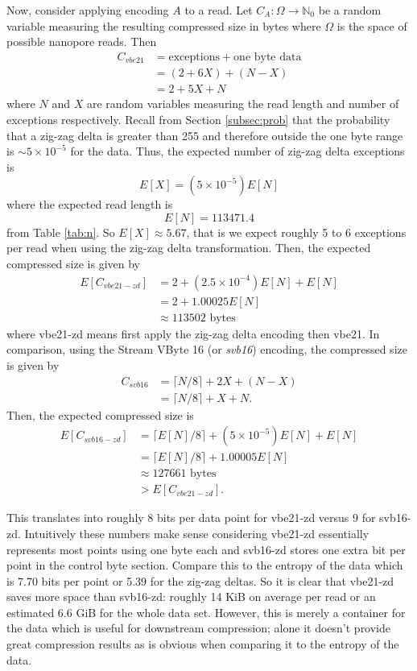 Now, consider applying encoding $A$ to a read. Let $C_A:\Omega\to\mathbb{N}_0$
be a random variable measuring the resulting compressed size in bytes where
$\Omega$ is the space of possible nanopore reads. Then
\begin{align*}
	C_{vbe21} &= \text{exceptions} + \text{one byte data}\\
	&= (2 + 6X) + (N - X)\\
	&= 2 + 5X + N
\end{align*}
where $N$ and $X$ are random variables measuring the read length and number of
exceptions respectively. Recall from Section \ref{subsec:prob} that the
probability that a zig-zag delta is greater than 255 and therefore outside the one
byte range is $\sim 5\times 10^{-5}$ for the data. Thus, the expected number of
zig-zag delta exceptions is
\[ E[X] = (5 \times 10^{-5})E[N] \]
where the expected read length is
\[ E[N] = 113471.4 \]
from Table \ref{tab:n}. So $E[X] \approx 5.67$, that is we expect roughly 5 to 6
exceptions per read when using the zig-zag delta transformation.
Then, the expected compressed size is given by
\begin{align*}
	E[C_{vbe21-zd}] &= 2 + (2.5\times 10^{-4})E[N]+ E[N]\\
	&= 2 + 1.00025E[N]\\
	&\approx 113502 \text{ bytes}
\end{align*}
where vbe21-zd means first apply the zig-zag delta encoding then vbe21. In
comparison, using the Stream VByte 16 (or \textit{svb16}) encoding, the
compressed size is given by
\begin{align*}
	C_{svb16} &= \lceil N/8 \rceil + 2X + (N - X)\\
	&= \lceil N/8 \rceil + X + N.
\end{align*}
Then, the expected compressed size is
\begin{align*}
	E[C_{svb16-zd}] &= \lceil E[N]/8 \rceil + (5 \times 10^{-5})E[N] + E[N]\\
	&= \lceil E[N]/8 \rceil + 1.00005E[N]\\
	&\approx 127661 \text{ bytes}\\
	&> E[C_{vbe21-zd}].
\end{align*}

This translates into roughly 8 bits per data point for vbe21-zd versus
9 for svb16-zd.
Intuitively these numbers make sense considering vbe21-zd essentially represents
most points using one byte each and svb16-zd stores one extra bit per point in
the control byte section.  Compare this to the entropy of the data which is 7.70
bits per point or 5.39 for the zig-zag deltas. So it is clear that
vbe21-zd saves more space than svb16-zd: roughly 14 KiB on average per read or
an estimated 6.6 GiB for the whole data set. However, this is merely a container
for the data which is useful for downstream compression; alone it doesn't
provide great compression results as is obvious when comparing it to the entropy
of the data.

